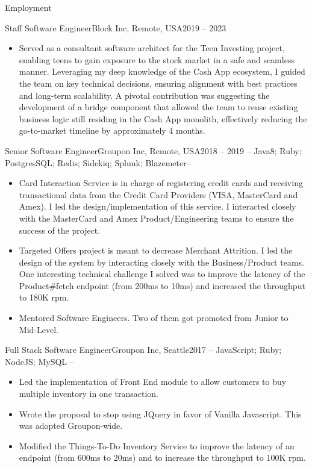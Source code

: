 \documentclass[includefoot]{mcdowellcv}
\begin{document}
\begin{cvsection}{Employment}
\begin{cvsubsection}{Staff Software Engineer}{Block Inc, Remote, USA}{2019 -- 2023}
\begin{itemize}
				\item Served as a consultant software architect for the Teen Investing project, enabling teens to gain exposure to the stock market in a safe and seamless manner. Leveraging my deep knowledge of the Cash App ecosystem, I guided the team on key technical decisions, ensuring alignment with best practices and long-term scalability. A pivotal contribution was suggesting the development of a bridge component that allowed the team to reuse existing business logic still residing in the Cash App monolith, effectively reducing the go-to-market timeline by approximately 4 months.   
			\end{itemize}
		\end{cvsubsection}
		\begin{cvsubsection}{Senior Software Engineer}{Groupon Inc, Remote, USA}{2018 -- 2019}
			 -- Java8; Ruby; PostgresSQL; Redis; Sidekiq; Splunk; Blazemeter--
			\begin{itemize}
				\item Card Interaction Service is in charge of registering credit cards and receiving transactional data from the Credit Card Providers (VISA, MasterCard and Amex). I led the design/implementation of this service. I interacted closely with the MasterCard and Amex Product/Engineering teams to ensure the success of the project. 
			 	\item Targeted Offers project is meant to decrease Merchant Attrition. I led the design of the system by interacting closely with the Business/Product teams. One interesting technical challenge I solved was to improve the latency of the Product\#fetch endpoint (from 200ms to 10ms) and increased the throughput to 180K rpm.
				\item Mentored Software Engineers. Two of them got promoted from Junior to Mid-Level.
			\end{itemize}
		\end{cvsubsection}
		\begin{cvsubsection}{Full Stack Software Engineer}{Groupon Inc, Seattle}{2017}
			 -- JavaScript; Ruby; NodeJS; MySQL --
			\begin{itemize}
			 	\item Led the implementation of Front End module to allow customers to buy multiple inventory in one transaction. 
				\item Wrote the proposal to stop using JQuery in favor of Vanilla Javascript. This was adopted Groupon-wide. 
				\item Modified the Things-To-Do Inventory Service to improve the latency of an endpoint (from 600ms to 20ms) and to increase the throughput to 100K rpm.

\end{itemize}
\end{cvsubsection}
\end{cvsection}
\end{document}
